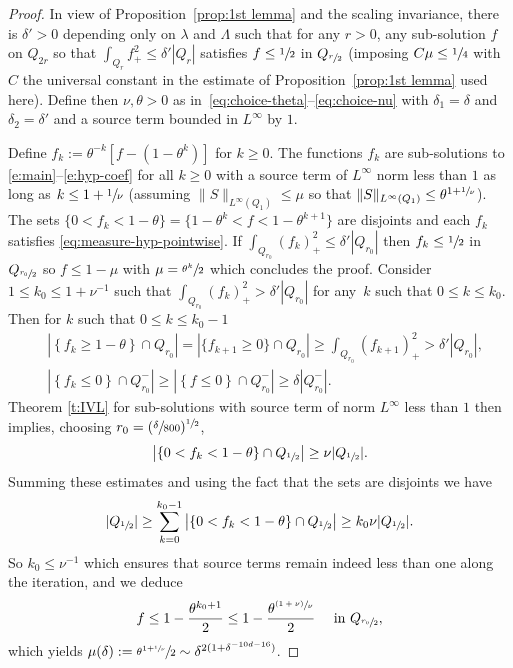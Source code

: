 \documentclass[JEP,XML,SOM,Unicode,NoFloatCountersInSection,published]{cedram}
\newcommand{\psfrac}[2]{\sfrac{(#1)}{#2}}
\theoremstyle{definition}
\theoremstyle{remark}
\begin{document}
\begin{proof}
In view of Proposition~\ref{prop:1st lemma} and the scaling
invariance, there is $\delta'>0$ depending only on $\lambda$
and $\Lambda$ such that for any $r>0$, any sub-solution $f$ on
$Q_{2r}$ so that $\int_{Q_{r}} f_{+}^2 \leq \delta' |Q_{r}|$
satisfies $f\leq \sfrac{1}{2}$ in $Q_{\sfrac{r}{2}}$ (imposing
$C\mu\le \sfrac{1}{4}$ with $C$ the universal constant in the
estimate of Proposition~\ref{prop:1st lemma} used here). Define
then $\nu, \theta>0$ as
in~\eqref{eq:choice-theta}--\eqref{eq:choice-nu} with
$\delta_1=\delta$ and $\delta_2=\delta'$ and a source term
bounded in $L^\infty$ by $1$.

Define $f_k := \theta^{-k}[f-(1-\theta^k)]$ for $k \ge 0$. The
functions $f_{k}$ are sub-solutions to
\eqref{e:main}--\eqref{e:hyp-coef} for all $k \ge 0$ with a
source term of $L^{\infty}$ norm less than $1$ as long as
$k\leq 1+\sfrac{1}{\nu}$ (assuming
$\| S\|_{L^{\infty}(Q_1)}\le \mu$ so that
$\| S\|_{L^{\infty}(Q_1)} \le \theta^{1+\sfrac{1}{\nu}}$). The
sets $\{ 0<f_{k}<1-\theta\}= \{1-\theta^k<f<1-\theta^{k+1}\}$
are disjoints and each $f_k$ satisfies
\eqref{eq:measure-hyp-pointwise}. If
$\int_{Q_{r_0}} (f_k)_{+}^2 \leq \delta' |Q_{r_0}|$ then
$f_k\leq \sfrac{1}{2}$ in $Q_{\sfrac{r_0}{2}}$ so $f\le 1-\mu$
with $\mu = \sfrac{\theta^k}{2}$ which concludes the proof.
Consider $ 1\leq k_0 \leq 1+\nu^{-1}$ such that
$\int_{Q_{r_0}} (f_{k})_{+}^2 > \delta'|Q_{r_0}|$ for any~$k$ such that $0\leq k\leq k_0$. Then for $k$ such that $0\leq k\leq k_0-1$
\begin{align*}
& \left|\left\{ f_{k}\geq 1-\theta \right\} \cap
Q_{r_0}\right| = \left|\{f_{k+1}\geq
0\} \cap Q_{r_0} \right| \geq \int_{Q_{r_0} } (f_{k+1})_{+}^2
> \delta' |Q_{r_0}|, \\
& \left|\left\{f_{k}\leq 0\right\} \cap Q_{r_0}^{-}\right|
\geq \left|\left\{f\leq 0 \right\}\cap Q_{r_0}^{-}\right|
\geq \delta |Q_{r_0}^-|.
\end{align*}
Theorem \ref{t:IVL} for sub-solutions with source term of norm
$L^{\infty}$ less than $1$ then implies, choosing $r_0 =
(\sfrac{\delta}{800})^{\sfrac12}$,
\[
\left| \left\{ 0<f_{k}< 1-\theta \right\}\cap Q_{\sfrac12}\right|
\geq \nu |Q_{\sfrac12}|.
\]
Summing these estimates and using the fact that the sets are
disjoints we have
\[
|Q_{\sfrac12}|\geq \sum_{k=0}^{k_0-1}
\left| \left\{ 0<f_{k}< 1-\theta \right\}\cap
Q_{\sfrac12} \right| \geq k_0 \nu |Q_{\sfrac12}|.
\]
So $k_0 \leq \nu^{-1}$ which ensures that source terms remain
indeed less than one along the iteration, and we deduce
\begin{align*}
f \leq 1-\frac{\theta^{k_0+1}}{2}\leq
1-\frac{\theta^{\psfrac{1+\nu}{\nu}}}{2} \quad \mbox{ in }
Q_{\sfrac{r_0}{2}},
\end{align*}
which yields
$\mu(\delta) := \sfrac{\theta^{1+\sfrac{1}{\nu}}}{2} \sim
\delta^{2 (1+\delta^{-10d-16})}$.
\end{proof}
\end{document}
